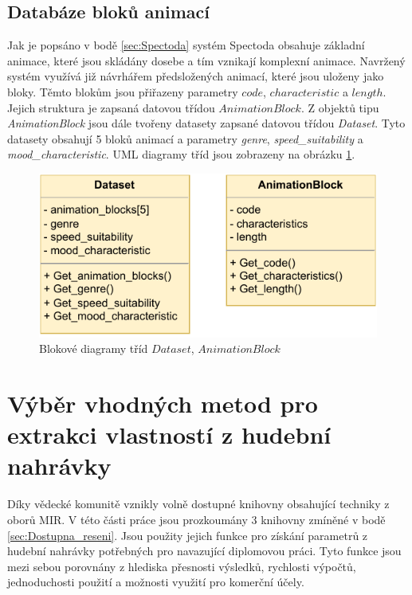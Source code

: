 \subsection{Databáze bloků animací} \label{sec:Database_structure}
Jak je popsáno v bodě \ref{sec:Spectoda} systém Spectoda obsahuje základní animace, které jsou skládány dosebe a tím vznikají komplexní animace. Navržený systém využívá již návrhářem předsložených animací, které jsou uloženy jako bloky. Těmto blokům jsou přiřazeny parametry $code$, $characteristic$ a $length$. Jejich struktura je zapsaná datovou třídou $AnimationBlock$.
Z objektů tipu \textit{AnimationBlock} jsou dále tvořeny datasety zapsané datovou třídou \textit{Dataset}. Tyto datasety obsahují 5 bloků animací a parametry \textit{genre}, \textit{speed\_suitability} a \textit{mood\_characteristic}. UML diagramy tříd jsou zobrazeny na obrázku \ref{fig:UML_diagram_Dataset_AnimationBlock}.

\begin{figure}[H]
    \centering
    \includegraphics[width = 0.7\linewidth]{obrazky/UML_diagram_Dataset_and_AnimationBlock.pdf}
    \caption{Blokové diagramy tříd $Dataset$, $AnimationBlock$}
    \label{fig:UML_diagram_Dataset_AnimationBlock}
\end{figure}

\section{Výběr vhodných metod pro extrakci vlastností z hudební nahrávky} \label{sec:Exktrakce_vlastnosti_metody}
Díky vědecké komunitě vznikly volně dostupné knihovny obsahující techniky z oborů MIR. V této části práce jsou prozkoumány 3 knihovny zmíněné v bodě \ref{sec:Dostupna_reseni}. Jsou použity jejich funkce pro získání parametrů z hudební nahrávky potřebných pro navazující diplomovou práci. Tyto funkce jsou mezi sebou porovnány z hlediska přesnosti výsledků, rychlosti výpočtů, jednoduchosti použití a možnosti využití pro komerční účely. 

